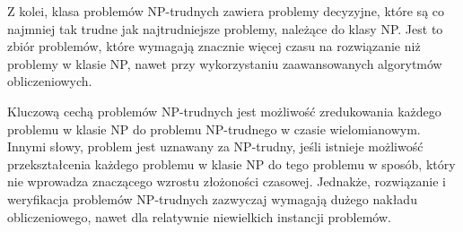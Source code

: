 Z kolei, klasa problemów NP-trudnych zawiera problemy decyzyjne, które są co najmniej tak trudne jak najtrudniejsze problemy, należące do klasy NP. Jest to zbiór problemów, które wymagają znacznie więcej czasu na rozwiązanie niż problemy w klasie NP, nawet przy wykorzystaniu zaawansowanych algorytmów obliczeniowych. 

Kluczową cechą problemów NP-trudnych jest możliwość zredukowania każdego problemu w klasie NP do problemu NP-trudnego w czasie wielomianowym. Innymi słowy, problem jest uznawany za NP-trudny, jeśli istnieje możliwość przekształcenia każdego problemu w klasie NP do tego problemu w sposób, który nie wprowadza znaczącego wzrostu złożoności czasowej. Jednakże, rozwiązanie i weryfikacja problemów NP-trudnych zazwyczaj wymagają dużego nakładu obliczeniowego, nawet dla relatywnie niewielkich instancji problemów.





